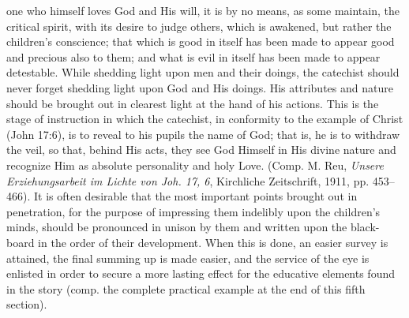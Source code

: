one who himself loves God and His will, it is by no means, as some maintain, the critical spirit, with its desire to judge others, which is awakened, but rather the children's conscience; that which is good in itself has been made to appear good and precious also to them; and what is evil in itself has been made to appear detestable. While shedding light upon men and their doings, the catechist should never forget shedding light upon God and His doings. His attributes and nature should be brought out in clearest light at the hand of his actions. This is the stage of instruction in which the catechist, in conformity to the example of Christ (John 17:6), is to reveal to his pupils the name of God; that is, he is to withdraw the veil, so that, behind His acts, they see God Himself in His divine nature and recognize Him as absolute personality and holy Love. (Comp. M. Reu, \emph{Unsere Erziehungsarbeit im Lichte von Joh. 17, 6}, Kirchliche Zeitschrift, 1911, pp. 453–466). It is often desirable that the most important points brought out in penetration, for the purpose of impressing them indelibly upon the children's minds, should be pronounced in unison by them and written upon the black-board in the order of their development. When this is done, an easier survey is attained, the final summing up is made easier, and the service of the eye is enlisted in order to secure a more lasting effect for the educative elements found in the story (comp. the complete practical example at the end of this fifth section).

